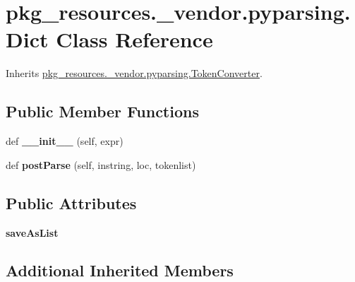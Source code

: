 \hypertarget{classpkg__resources_1_1__vendor_1_1pyparsing_1_1_dict}{}\section{pkg\+\_\+resources.\+\_\+vendor.\+pyparsing.\+Dict Class Reference}
\label{classpkg__resources_1_1__vendor_1_1pyparsing_1_1_dict}


Inherits \hyperlink{classpkg__resources_1_1__vendor_1_1pyparsing_1_1_token_converter}{pkg\+\_\+resources.\+\_\+vendor.\+pyparsing.\+Token\+Converter}.

\subsection*{Public Member Functions}
\begin{DoxyCompactItemize}
\item 
\mbox{\label{classpkg__resources_1_1__vendor_1_1pyparsing_1_1_dict_a9947971188f313f29fcb5e7b17553590}} 
def {\bfseries \+\_\+\+\_\+init\+\_\+\+\_\+} (self, expr)
\item 
\mbox{\label{classpkg__resources_1_1__vendor_1_1pyparsing_1_1_dict_a409afd6d2b45eafdad3517e5fda85aad}} 
def {\bfseries post\+Parse} (self, instring, loc, tokenlist)
\end{DoxyCompactItemize}
\subsection*{Public Attributes}
\begin{DoxyCompactItemize}
\item 
\mbox{\label{classpkg__resources_1_1__vendor_1_1pyparsing_1_1_dict_aad6d9389f9104418a05021ec795f6049}} 
{\bfseries save\+As\+List}
\end{DoxyCompactItemize}
\subsection*{Additional Inherited Members}


